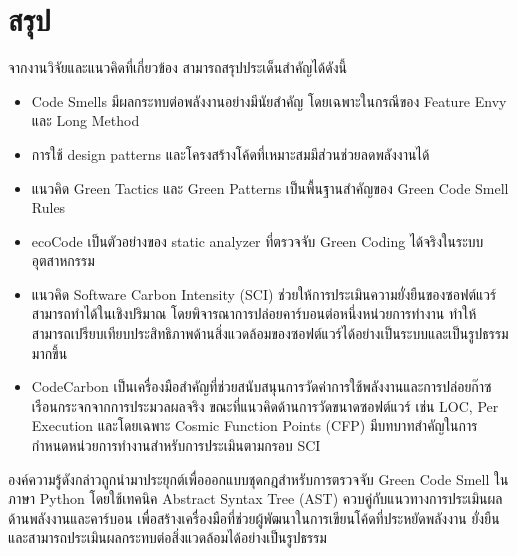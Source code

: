
\section{สรุป}
จากงานวิจัยและแนวคิดที่เกี่ยวข้อง สามารถสรุปประเด็นสำคัญได้ดังนี้

\begin{itemize}
    \item Code Smells มีผลกระทบต่อพลังงานอย่างมีนัยสำคัญ โดยเฉพาะในกรณีของ Feature Envy และ Long Method~\cite{verdecchia2018energy}
    \item การใช้ design patterns และโครงสร้างโค้ดที่เหมาะสมมีส่วนช่วยลดพลังงานได้~\cite{poy2025impact}
    \item แนวคิด Green Tactics และ Green Patterns เป็นพื้นฐานสำคัญของ Green Code Smell Rules~\cite{leGoaer2024tactics}
    \item ecoCode เป็นตัวอย่างของ static analyzer ที่ตรวจจับ Green Coding ได้จริงในระบบอุตสาหกรรม~\cite{legoaer2023ecocode}
    \item แนวคิด Software Carbon Intensity (SCI) ช่วยให้การประเมินความยั่งยืนของซอฟต์แวร์สามารถทำได้ในเชิงปริมาณ โดยพิจารณาการปล่อยคาร์บอนต่อหนึ่งหน่วยการทำงาน ทำให้สามารถเปรียบเทียบประสิทธิภาพด้านสิ่งแวดล้อมของซอฟต์แวร์ได้อย่างเป็นระบบและเป็นรูปธรรมมากขึ้น~\cite{sciSpecification}
    \item CodeCarbon เป็นเครื่องมือสำคัญที่ช่วยสนับสนุนการวัดค่าการใช้พลังงานและการปล่อยก๊าซเรือนกระจกจากการประมวลผลจริง ขณะที่แนวคิดด้านการวัดขนาดซอฟต์แวร์ เช่น LOC, Per Execution และโดยเฉพาะ Cosmic Function Points (CFP) มีบทบาทสำคัญในการกำหนดหน่วยการทำงานสำหรับการประเมินตามกรอบ SCI~\cite{codecarbonMethodology,vanHeeringen2015size,abran2018cosmic}
\end{itemize}

องค์ความรู้ดังกล่าวถูกนำมาประยุกต์เพื่อออกแบบชุดกฎสำหรับการตรวจจับ Green Code Smell ในภาษา Python โดยใช้เทคนิค Abstract Syntax Tree (AST) ควบคู่กับแนวทางการประเมินผลด้านพลังงานและคาร์บอน เพื่อสร้างเครื่องมือที่ช่วยผู้พัฒนาในการเขียนโค้ดที่ประหยัดพลังงาน ยั่งยืน และสามารถประเมินผลกระทบต่อสิ่งแวดล้อมได้อย่างเป็นรูปธรรม